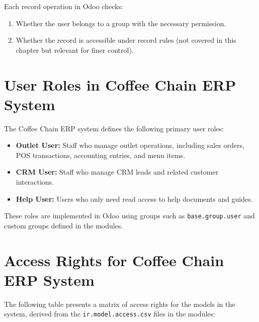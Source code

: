 Each record operation in Odoo checks:
\begin{enumerate}
    \item Whether the user belongs to a group with the necessary permission.
    \item Whether the record is accessible under record rules (not covered in this chapter but relevant for finer control).
\end{enumerate}

\section*{User Roles in Coffee Chain ERP System}
The Coffee Chain ERP system defines the following primary user roles:

\begin{itemize}
    \item \textbf{Outlet User:} Staff who manage outlet operations, including sales orders, POS transactions, accounting entries, and menu items.
    \item \textbf{CRM User:} Staff who manage CRM leads and related customer interactions.
    \item \textbf{Help User:} Users who only need read access to help documents and guides.
\end{itemize}

These roles are implemented in Odoo using groups such as \texttt{base.group.user} and custom groups defined in the modules.

\section*{Access Rights for Coffee Chain ERP System}
The following table presents a matrix of access rights for the models in the system, derived from the \texttt{ir.model.access.csv} files in the modules:

